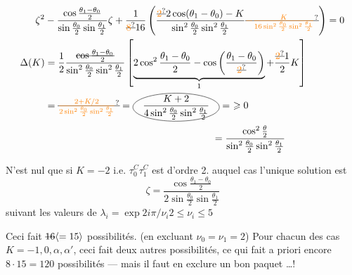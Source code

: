 \[
\begin{aligned}
\zeta^2&-\frac{\cos\frac{\theta_1-\theta_0}2}{\sin\frac{\theta_0}2\sin\frac{\theta_1}2}\zeta+
\frac{1}{\deleted{\unsure{8}}16}\left(
\frac{\deleted{\unsure{2}}2\cos(\theta_1-\theta_0)-K}
{\sin^2\frac{\theta_0}2\sin^2\frac{\theta_1}2}
\deleted{\unsure{-\frac{K}{16\sin^2\frac{\theta_0}2\sin^2\frac{\theta_1}2}}}\right)=0\\
\Delta(K)&=\frac12\frac{\deleted{\cos\frac{\theta_1-\theta_0}2}}{\sin^2\frac{\theta_0}2\sin^2\frac{\theta_1}2}
\left[\underbrace{2\cos^2\frac{\theta_1-\theta_0}2-\cos\left(\frac{\theta_1-\theta_0}{\deleted{\unsure{2}}}\right)}_{1}+
\frac{\deleted{\unsure{2}}1}{2}K\right]\\
&=\deleted{\unsure{\frac{2+K/2}{2\sin^2\frac{\theta_0}2\sin^2\frac{\theta_1}2}}}
=\begin{tikzpicture}[baseline=(x.base)]\node[inner sep=1pt](x){$\displaystyle\frac{K+2}{4\sin^2\frac{\theta_0}2\sin^2\frac{\theta_1}2}$};\draw (x.center) ellipse (1.55cm and .50cm);\end{tikzpicture}
=\ \geqslant0\\
&\hspace{6cm}=\frac{\cos^2\frac\theta2}{\sin^2\frac{\theta_0}2\sin^2\frac{\theta_1}2}
\end{aligned}
\]


N'est nul que si $K=-2$ i.e. $\tau_0^C\tau_1^C$ est d'ordre 2. auquel cas l'unique solution est
\[
\boxed{\zeta=\frac{\cos\frac{\theta_1-\theta_0}2}{2\sin\frac{\theta_0}2\sin\frac{\theta_1}2}}
\]
suivant les valeurs de $\lambda_i=\exp 2i\pi/\nu_i$\quad $2\leq\nu_i\leq5$

Ceci fait $\deleted{16}\inserted{=15}$ possibilités. (en excluant $\nu_0=\nu_1=2$)
Pour chacun des  cas $K=-1,0,\alpha,\alpha'$, ceci fait deux autres possibilités, ce qui fait a priori encore $8\cdot15=120$ possibilités --- mais il faut en exclure un bon paquet \ldots !

